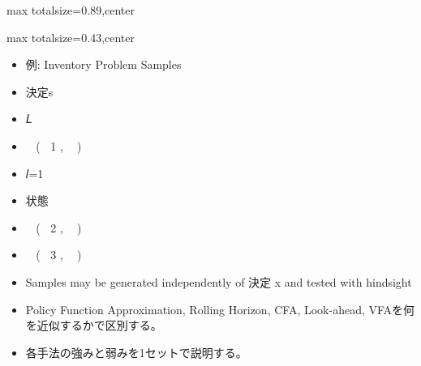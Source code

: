 \begin{minipage}[t]{0.58\textwidth}
\begin{adjustbox}{max totalsize={\textwidth}{0.89\textheight},center}
\begin{minipage}{\textwidth}
\end{minipage}
\end{adjustbox}
\end{minipage}


\clearpage
{}
\begin{minipage}[t]{0.405\textwidth}
\begin{adjustbox}{max totalsize={\textwidth}{0.43\textheight},center}
\begin{minipage}{\textwidth}\scriptsize
{}\begin{itemize}
\item 例: Inventory Problem Samples
\item 決定s
\item 𝐿
\item ෍ 𝑅(𝑆 𝑥1 , 𝜔𝑙 )
\item 𝑙=1
\item 状態
\item ෍ 𝑅(𝑆 𝑥2 , 𝜔𝑙 )
\item ෍ 𝑅(𝑆 𝑥3 , 𝜔𝑙 )
\item Samples may be generated independently of 決定 x and tested with hindsight
\end{itemize}\begin{itemize}
\item Policy Function Approximation, Rolling Horizon, CFA, Look-ahead, VFAを何を近似するかで区別する。
\item 各手法の強みと弱みを1セットで説明する。
\end{itemize}
\end{minipage}
\end{adjustbox}
\end{minipage}\hfill
